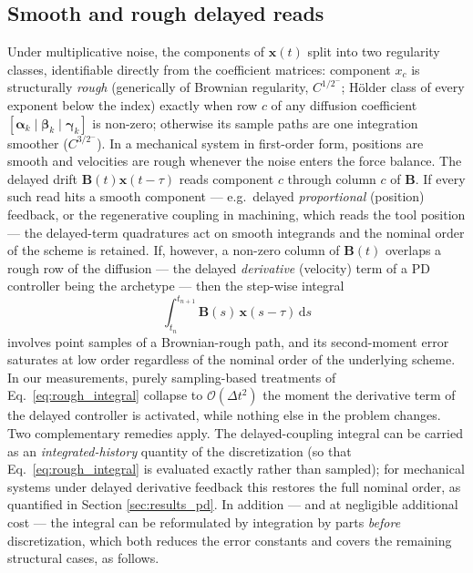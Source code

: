 \documentclass[preprint,12pt]{elsarticle}
\begin{document}
\subsection{Smooth and rough delayed reads}
Under multiplicative noise, the components of $\mathbf{x}(t)$ split into two regularity classes, identifiable directly from the coefficient matrices: component $x_c$ is structurally \emph{rough} (generically of Brownian regularity, $C^{1/2^-}$; H\"older class of every exponent below the index) exactly when row $c$ of any diffusion coefficient $[\boldsymbol{\alpha}_k \mid \boldsymbol{\beta}_k \mid \boldsymbol{\gamma}_k]$ is non-zero; otherwise its sample paths are one integration smoother ($C^{3/2^-}$). In a mechanical system in first-order form, positions are smooth and velocities are rough whenever the noise enters the force balance. The delayed drift $\mathbf{B}(t)\mathbf{x}(t-\tau)$ reads component $c$ through column $c$ of $\mathbf{B}$. If every such read hits a smooth component --- e.g.\ delayed \emph{proportional} (position) feedback, or the regenerative coupling in machining, which reads the tool position --- the delayed-term quadratures act on smooth integrands and the nominal order of the scheme is retained. If, however, a non-zero column of $\mathbf{B}(t)$ overlaps a rough row of the diffusion --- the delayed \emph{derivative} (velocity) term of a PD controller being the archetype --- then the step-wise integral
\begin{equation}
\label{eq:rough_integral}
\int_{t_n}^{t_{n+1}} \mathbf{B}(s)\, \mathbf{x}(s-\tau)\, \mathrm{d}s
\end{equation}
involves point samples of a Brownian-rough path, and its second-moment error saturates at low order regardless of the nominal order of the underlying scheme. In our measurements, purely sampling-based treatments of Eq.~\eqref{eq:rough_integral} collapse to $\mathcal{O}(\Delta t^{2})$ the moment the derivative term of the delayed controller is activated, while nothing else in the problem changes. Two complementary remedies apply. The delayed-coupling integral can be carried as an \emph{integrated-history} quantity of the discretization (so that Eq.~\eqref{eq:rough_integral} is evaluated exactly rather than sampled); for mechanical systems under delayed derivative feedback this restores the full nominal order, as quantified in Section \ref{sec:results_pd}. In addition --- and at negligible additional cost --- the integral can be reformulated by integration by parts \emph{before} discretization, which both reduces the error constants and covers the remaining structural cases, as follows.
\end{document}
